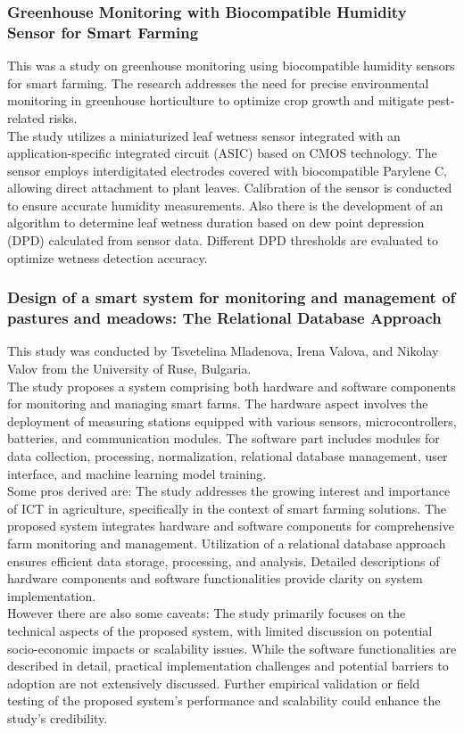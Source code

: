 \documentclass[12pt, a4paper]{article}
\begin{document}
\subsubsection{Greenhouse Monitoring with Biocompatible Humidity Sensor for Smart Farming}
This was a study on greenhouse monitoring using biocompatible humidity sensors for smart farming. The research addresses the need for precise environmental monitoring in greenhouse horticulture to optimize crop growth and mitigate pest-related risks.\\
 The study utilizes a miniaturized leaf wetness sensor integrated with an application-specific integrated circuit (ASIC) based on CMOS technology. The sensor employs interdigitated electrodes covered with biocompatible Parylene C, allowing direct attachment to plant leaves. Calibration of the sensor is conducted to ensure accurate humidity measurements. Also there is the development of  an algorithm to determine leaf wetness duration based on dew point depression (DPD) calculated from sensor data. Different DPD thresholds are evaluated to optimize wetness detection accuracy.
 
 \subsubsection{Design of a smart system for monitoring and management of pastures and meadows: The Relational Database Approach}
This study was conducted by Tsvetelina Mladenova, Irena Valova, and Nikolay Valov from the University of Ruse, Bulgaria.\\
The study proposes a system comprising both hardware and software components for monitoring and managing smart farms. The hardware aspect involves the deployment of measuring stations equipped with various sensors, microcontrollers, batteries, and communication modules. The software part includes modules for data collection, processing, normalization, relational database management, user interface, and machine learning model training.\\
Some pros derived are: The study addresses the growing interest and importance of ICT in agriculture, specifically in the context of smart farming solutions. The proposed system integrates hardware and software components for comprehensive farm monitoring and management. Utilization of a relational database approach ensures efficient data storage, processing, and analysis. Detailed descriptions of hardware components and software functionalities provide clarity on system implementation.\\
However there are also some caveats: The study primarily focuses on the technical aspects of the proposed system, with limited discussion on potential socio-economic impacts or scalability issues. While the software functionalities are described in detail, practical implementation challenges and potential barriers to adoption are not extensively discussed. Further empirical validation or field testing of the proposed system's performance and scalability could enhance the study's credibility.
\end{document}
